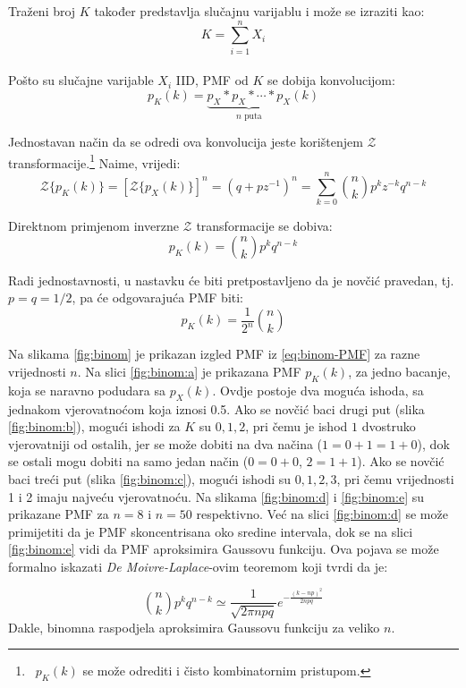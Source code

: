 Traženi broj $K$ također predstavlja slučajnu varijablu i može se izraziti
kao:
$$K = \sum_{i=1}^{n} X_i$$
\\

Pošto su slučajne varijable $X_i$ IID, PMF od $K$ se dobija konvolucijom:
$$p_K(k) = \underbrace{p_X * p_X * \cdots * p_X}_{n\text{ puta}}(k)$$

Jednostavan način da se odredi ova konvolucija jeste korištenjem
$\mathcal{Z}$ transformacije.\footnote{\ $p_K(k)$ se može odrediti i čisto
kombinatornim pristupom.}
Naime, vrijedi:
\begin{equation}
  \mathcal{Z}\{p_K(k)\}
  = \left[\mathcal{Z}\{p_X(k)\}\right]^n
  = (q+pz^{-1})^n
  = \sum_{k=0}^{n} \binom{n}{k} p^k z^{-k} q^{n-k}
\end{equation}

Direktnom primjenom inverzne $ \mathcal{Z}$ transformacije se dobiva:
\begin{equation}
  p_K(k) = \binom{n}{k} p^kq^{n-k}
\end{equation}

Radi jednostavnosti, u nastavku će biti pretpostavljeno da je novčić pravedan,
tj. $p=q=1/2$, pa će odgovarajuća PMF biti:
\begin{equation} \label{eq:binom-PMF}
  p_K(k) = \frac{1}{2^n} \binom{n}{k}
\end{equation}

Na slikama \ref{fig:binom} je prikazan izgled PMF iz \eqref{eq:binom-PMF} za
razne vrijednosti $n$.  Na slici \ref{fig:binom:a} je prikazana PMF $p_K(k)$, za
jedno bacanje, koja se naravno podudara sa $p_X(k)$. Ovdje postoje dva moguća
ishoda, sa jednakom vjerovatnoćom koja iznosi 0.5. Ako se novčić baci drugi put
(slika \ref{fig:binom:b}), mogući ishodi za $K$ su $0, 1, 2$, pri čemu je ishod
$1$ dvostruko vjerovatniji od ostalih, jer se može dobiti na dva načina
($1=0+1=1+0$), dok se ostali mogu dobiti na samo jedan način ($0=0+0$, $2=1+1$).
Ako se novčić baci treći put (slika \ref{fig:binom:c}), mogući ishodi su
$0,1,2,3$, pri čemu vrijednosti 1 i 2 imaju najveću vjerovatnoću. Na slikama
\ref{fig:binom:d} i \ref{fig:binom:e} su prikazane PMF za $n=8$ i $n=50$
respektivno. Već na slici \ref{fig:binom:d} se može primijetiti da je PMF
skoncentrisana oko sredine intervala, dok se na slici \ref{fig:binom:e} vidi da
PMF aproksimira Gaussovu funkciju. Ova pojava se može formalno iskazati
\textit{De Moivre-Laplace}-ovim teoremom koji tvrdi da je:

\begin{equation}
  \binom{n}{k}p^kq^{n-k} \simeq \frac{1}{\sqrt{2\pi npq}}
  e^{-\frac{(k-np)^2}{2npq}}
\end{equation}
Dakle, binomna raspodjela aproksimira Gaussovu funkciju za veliko $n$. \\

